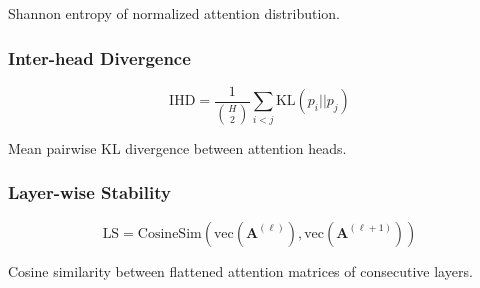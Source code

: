 Shannon entropy of normalized attention distribution.

\subsubsection{Inter-head Divergence}

\begin{equation}
\text{IHD} = \frac{1}{\binom{H}{2}} \sum_{i < j} \text{KL}(p_i || p_j)
\end{equation}

Mean pairwise KL divergence between attention heads.

\subsubsection{Layer-wise Stability}

\begin{equation}
\text{LS} = \text{CosineSim}(\text{vec}(\mathbf{A}^{(\ell)}), \text{vec}(\mathbf{A}^{(\ell+1)}))
\end{equation}

Cosine similarity between flattened attention matrices of consecutive layers.

